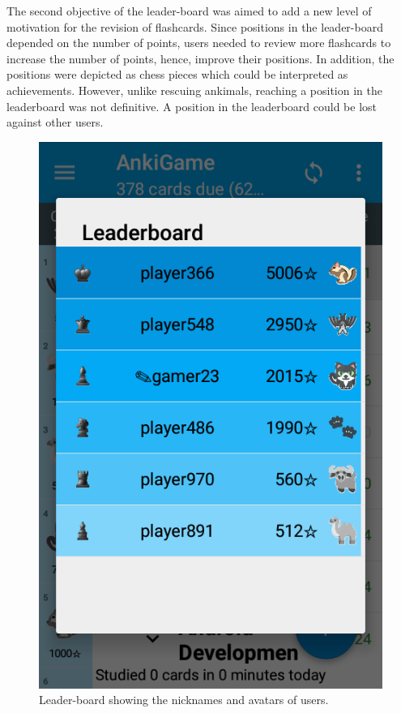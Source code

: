 The second objective of the leader-board was aimed to add a new level of motivation for the revision of flashcards. Since positions in the leader-board depended on the number of points, users needed to review more flashcards to increase the number of points, hence, improve their positions. In addition, the positions were depicted as chess pieces which could be interpreted as achievements. However, unlike rescuing ankimals, reaching a position in the leaderboard was not definitive. A position in the leaderboard could be lost against other users.

\begin{figure}[htb]
    \vskip 5mm
        \begin{center}
            \includegraphics[scale=0.4]{./Figures/leaderboard.png}
            \caption{Leader-board showing the nicknames and avatars of users.}
            \label{fig:leaderboard}
        \end{center}
    \vskip -5mm
\end{figure}

